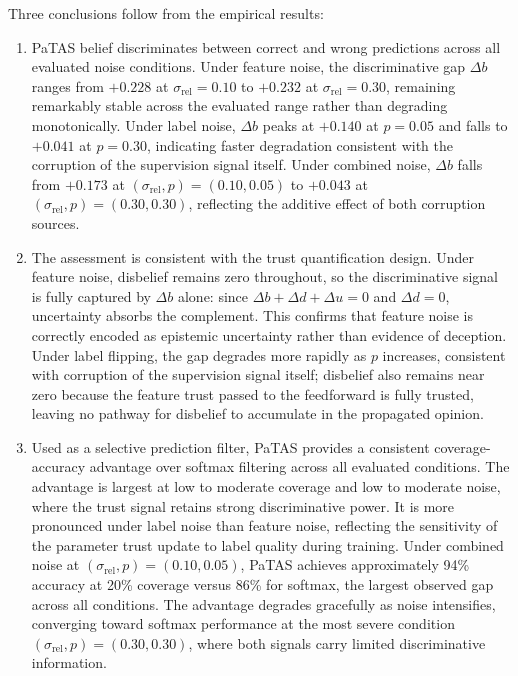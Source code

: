 Three conclusions follow from the empirical results:
\begin{enumerate}
    \item \ac{PaTAS} belief discriminates between correct and wrong predictions across all evaluated noise conditions. Under feature noise, the discriminative gap $\Delta b$ ranges from $+0.228$ at $\sigma_{\text{rel}} = 0.10$ to $+0.232$ at $\sigma_{\text{rel}} = 0.30$, remaining remarkably stable across the evaluated range rather than degrading monotonically. Under label noise, $\Delta b$ peaks at $+0.140$ at $p = 0.05$ and falls to $+0.041$ at $p = 0.30$, indicating faster degradation consistent with the corruption of the supervision signal itself. Under combined noise, $\Delta b$ falls from $+0.173$ at $(\sigma_{\text{rel}}, p) = (0.10, 0.05)$ to $+0.043$ at $(\sigma_{\text{rel}}, p) = (0.30, 0.30)$, reflecting the additive effect of both corruption sources.
    
    \item The assessment is consistent with the trust quantification design. Under feature noise, disbelief remains zero throughout, so the discriminative signal is fully captured by $\Delta b$ alone: since $\Delta b + \Delta d + \Delta u = 0$ and $\Delta d = 0$, uncertainty absorbs the complement. This confirms that feature noise is correctly encoded as epistemic uncertainty rather than evidence of deception. Under label flipping, the gap degrades more rapidly as $p$ increases, consistent with corruption of the supervision signal itself; disbelief also remains near zero because the feature trust passed to the feedforward is fully trusted, leaving no pathway for disbelief to accumulate in the propagated opinion.
    
    \item Used as a selective prediction filter, \ac{PaTAS} provides a consistent coverage-accuracy advantage over softmax filtering across all evaluated conditions. The advantage is largest at low to moderate coverage and low to moderate noise, where the trust signal retains strong discriminative power. It is more pronounced under label noise than feature noise, reflecting the sensitivity of the parameter trust update to label quality during training. Under combined noise at $(\sigma_{\text{rel}}, p) = (0.10, 0.05)$, \ac{PaTAS} achieves approximately 94\% accuracy at 20\% coverage versus 86\% for softmax, the largest observed gap across all conditions. The advantage degrades gracefully as noise intensifies, converging toward softmax performance at the most severe condition $(\sigma_{\text{rel}}, p) = (0.30, 0.30)$, where both signals carry limited discriminative information.
\end{enumerate}


